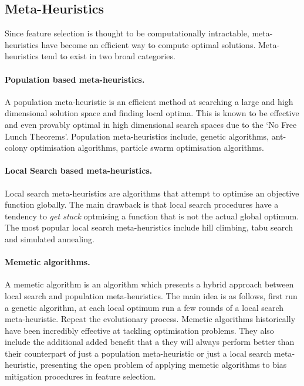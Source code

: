 \documentclass[conference]{IEEEtran}
\begin{document}
\subsection{Meta-Heuristics}

Since feature selection is thought to be computationally intractable, meta-heuristics have become an efficient way to compute optimal solutions. Meta-heuristics tend to exist in two broad categories.

\paragraph{Population based meta-heuristics.} A population meta-heuristic is an efficient method at searching a large and high dimensional solution space and finding local optima. This is known to be effective and even provably optimal in high dimensional search spaces due to the `No Free Lunch Theorems'. Population meta-heuristics include, genetic algorithms, ant-colony optimisation algorithms, particle swarm optimisation algorithms.

\paragraph{Local Search based meta-heuristics.} Local search meta-heuristics are algorithms that attempt to optimise an objective function globally. The main drawback is that local search procedures have a tendency to \textit{get stuck} optmising a function that is not the actual global optimum. The most popular local search meta-heuristics include hill climbing, tabu search and simulated annealing.

\paragraph{Memetic algorithms.} A memetic algorithm is an algorithm which presents a hybrid approach between local search and population meta-heuristics. The main idea is as follows, first run a genetic algorithm, at each local optimum run a few rounds of a local search meta-heuristic. Repeat the evolutionary process. Memetic algorithms historically have been incredibly effective at tackling optimisation problems. They also include the additional added benefit that a they will always perform better than their counterpart of just a population meta-heuristic or just a local search meta-heuristic, presenting the open problem of applying memetic algorithms to bias mitigation procedures in feature selection.
\end{document}
